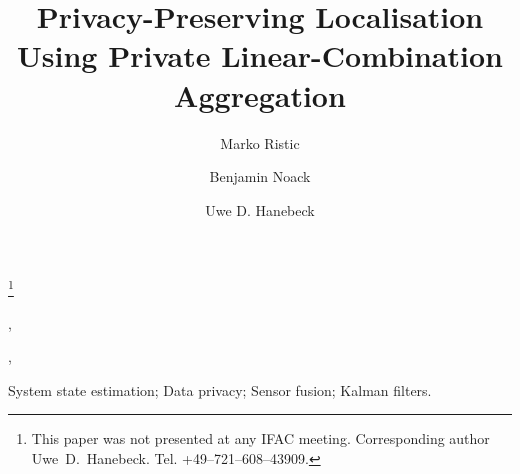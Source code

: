 \documentclass[twocolumn]{autart}
\begin{document}
\begin{frontmatter}

\title{Privacy-Preserving Localisation Using Private Linear-Combination Aggregation}

\thanks[footnoteinfo]{This paper was not presented at any IFAC 
meeting. Corresponding author Uwe~D.~Hanebeck. Tel. +49--721--608--43909.}

\author[ISAS]{Marko Ristic},
\author[ISAS]{Benjamin Noack},
\author[ISAS]{Uwe D. Hanebeck}

\address[ISAS]{Intelligent Sensor-Actuator-Systems Laboratory, Institute for Anthropomatics, Karlsruhe Institute of Technology, 76131 Karlsruhe, Germany}

\begin{keyword}
System state estimation; Data privacy; Sensor fusion; Kalman filters.
\end{keyword}

% 
%                                                                                             
%                                                                                             
%                                                                                             
% 


\end{frontmatter}
\end{document}
